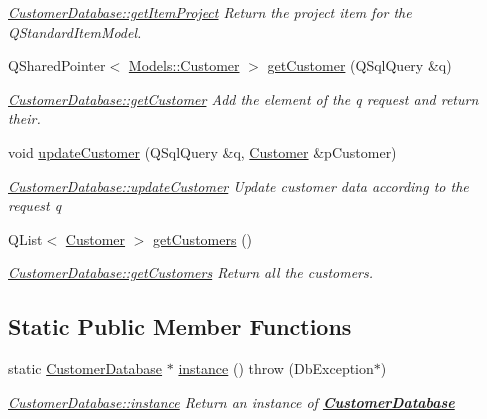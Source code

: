 \begin{DoxyCompactItemize}
\begin{DoxyCompactList}\small\item\em \hyperlink{classDatabases_1_1CustomerDatabase_a641001509d0385000b5b831c134c78c4}{Customer\-Database\-::get\-Item\-Project} Return the project item for the Q\-Standard\-Item\-Model. \end{DoxyCompactList}\item 
Q\-Shared\-Pointer$<$ \hyperlink{classModels_1_1Customer}{Models\-::\-Customer} $>$ \hyperlink{classDatabases_1_1CustomerDatabase_a23017b6db7808fa1d03e55e063418670}{get\-Customer} (Q\-Sql\-Query \&q)
\begin{DoxyCompactList}\small\item\em \hyperlink{classDatabases_1_1CustomerDatabase_ab0544439382fb6891cd7d27f67cb120c}{Customer\-Database\-::get\-Customer} Add the element of the {\itshape q} request and return their. \end{DoxyCompactList}\item 
void \hyperlink{classDatabases_1_1CustomerDatabase_aedb0c575bd9141547e4e084fd260beb7}{update\-Customer} (Q\-Sql\-Query \&q, \hyperlink{classModels_1_1Customer}{Customer} \&p\-Customer)
\begin{DoxyCompactList}\small\item\em \hyperlink{classDatabases_1_1CustomerDatabase_a83493698214a2e8e68024d007e715f35}{Customer\-Database\-::update\-Customer} Update customer data according to the request {\itshape q} \end{DoxyCompactList}\item 
Q\-List$<$ \hyperlink{classModels_1_1Customer}{Customer} $>$ \hyperlink{classDatabases_1_1CustomerDatabase_aecb30e5fc92b73a43fc99c799e8ba964}{get\-Customers} ()
\begin{DoxyCompactList}\small\item\em \hyperlink{classDatabases_1_1CustomerDatabase_aecb30e5fc92b73a43fc99c799e8ba964}{Customer\-Database\-::get\-Customers} Return all the customers. \end{DoxyCompactList}\end{DoxyCompactItemize}
\subsection*{Static Public Member Functions}
\begin{DoxyCompactItemize}
\item 
static \hyperlink{classDatabases_1_1CustomerDatabase}{Customer\-Database} $\ast$ \hyperlink{classDatabases_1_1CustomerDatabase_a564b9978741e84e75d7e20003f7bf515}{instance} ()  throw (\-Db\-Exception$\ast$)
\begin{DoxyCompactList}\small\item\em \hyperlink{classDatabases_1_1CustomerDatabase_a564b9978741e84e75d7e20003f7bf515}{Customer\-Database\-::instance} Return an instance of {\bfseries \hyperlink{classDatabases_1_1CustomerDatabase}{Customer\-Database}} \end{DoxyCompactList}\end{DoxyCompactItemize}
